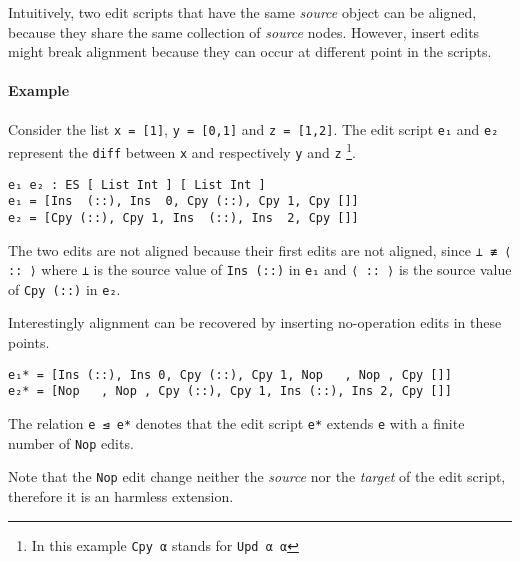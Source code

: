 \documentclass{sigplanconf}
\theoremstyle{plain}
\begin{document}
        Intuitively, two edit scripts that have the same \emph{source}
        object can be aligned, because they share the same collection
        of \emph{source} nodes.
        However, insert edits might break alignment because they can
        occur at different point in the scripts.

        \paragraph{Example}
        Consider the list \texttt{x = [1]}, \texttt{y = [0,1]} and \texttt{z = [1,2]}.
        The edit script \texttt{e₁} and \texttt{e₂} represent the \texttt{diff} between \texttt{x} and
        respectively \texttt{y} and \texttt{z} \footnote{In this example \texttt{Cpy α} stands for \texttt{Upd α α}}.

\begin{verbatim}
e₁ e₂ : ES [ List Int ] [ List Int ]
e₁ = [Ins  (::), Ins  0, Cpy (::), Cpy 1, Cpy []]
e₂ = [Cpy (::), Cpy 1, Ins  (::), Ins  2, Cpy []] 
\end{verbatim}       

        The two edits are not aligned because their first edits are not aligned, since \texttt{⊥ ≢ ⟨ :: ⟩}
        where \texttt{⊥} is the source value of \texttt{Ins (::)} in \texttt{e₁} and \texttt{⟨ :: ⟩} is
        the source value of \texttt{Cpy (::)} in \texttt{e₂}.

        Interestingly alignment can be recovered by inserting no-operation edits in 
        these points. 
\begin{verbatim}
e₁* = [Ins (::), Ins 0, Cpy (::), Cpy 1, Nop   , Nop , Cpy []]
e₂* = [Nop   , Nop , Cpy (::), Cpy 1, Ins (::), Ins 2, Cpy []] 
\end{verbatim}
        The relation \texttt{e ⊴ e*} denotes that the edit script
        \texttt{e*} extends \texttt{e} with a finite number of
        \texttt{Nop} edits.

        Note that the \texttt{Nop} edit change neither the
        \emph{source} nor the \emph{target} of the edit script,
        therefore it is an harmless extension.
        
\end{document}
